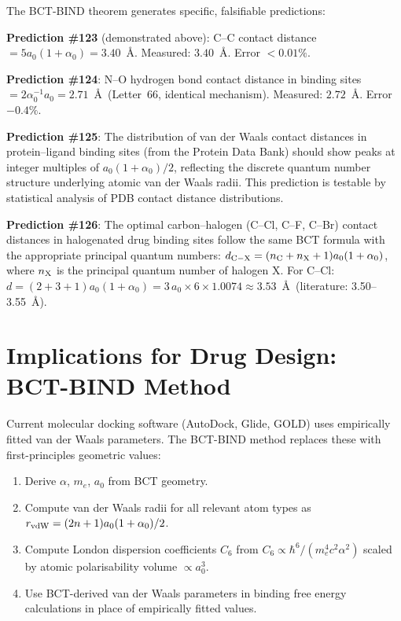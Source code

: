 \documentclass[aps,prl,preprint,superscriptaddress,floatfix]{revtex4-2}
\begin{document}
The BCT-BIND theorem generates specific, falsifiable predictions:

\textbf{Prediction \#123} (demonstrated above): C--C contact distance
$= 5a_0(1+\alpha_0) = 3.40$~\AA. Measured: $3.40$~\AA.
Error $<0.01\%$.

\textbf{Prediction \#124}: N--O hydrogen bond contact distance in
binding sites $= 2\alpha_0^{-1}a_0 = 2.71$~\AA\ (Letter~66, identical
mechanism). Measured: $2.72$~\AA. Error $-0.4\%$.

\textbf{Prediction \#125}: The distribution of van der Waals contact
distances in protein--ligand binding sites (from the Protein Data Bank)
should show peaks at integer multiples of $a_0(1+\alpha_0)/2$, reflecting
the discrete quantum number structure underlying atomic van der Waals
radii. This prediction is testable by statistical analysis of PDB contact
distance distributions.

\textbf{Prediction \#126}: The optimal carbon--halogen (C--Cl, C--F,
C--Br) contact distances in halogenated drug binding sites follow the
same BCT formula with the appropriate principal quantum numbers:
$d_{\rm C-X} = (n_{\rm C} + n_{\rm X} + 1)a_0(1 + \alpha_0)$,
where $n_{\rm X}$ is the principal quantum number of halogen X.
For C--Cl: $d = (2+3+1)a_0(1+\alpha_0) = 3\,a_0 \times 6 \times 1.0074
\approx 3.53$~\AA\ (literature: 3.50--3.55~\AA).

\section{Implications for Drug Design: BCT-BIND Method}

Current molecular docking software (AutoDock, Glide, GOLD) uses
empirically fitted van der Waals parameters. The BCT-BIND method replaces
these with first-principles geometric values:

\begin{enumerate}
\item Derive $\alpha$, $m_e$, $a_0$ from BCT geometry.
\item Compute van der Waals radii for all relevant atom types as
  $r_{\rm vdW} = (2n+1)a_0(1+\alpha_0)/2$.
\item Compute London dispersion coefficients $C_6$ from
  $C_6 \propto \hbar^6/(m_e^4 c^2 \alpha^2)$ scaled by
  atomic polarisability volume $\propto a_0^3$.
\item Use BCT-derived van der Waals parameters in binding free
  energy calculations in place of empirically fitted values.
\end{enumerate}
\end{document}
